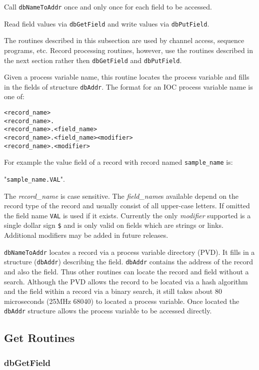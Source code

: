 Call \verb|dbNameToAddr| once and only once for each field to be accessed.

Read field values via \verb|dbGetField| and write values via \verb|dbPutField|.

The routines described in this subsection are used by channel access, sequence programs, etc. Record processing routines, 
however, use the routines described in the next section rather then \verb|dbGetField| and \verb|dbPutField|.

Given a process variable name, this routine locates the process variable and fills in the fields of structure \verb|dbAddr|. The 
format for an IOC process variable name is one of:

\begin{verbatim}<record_name>
<record_name>.
<record_name>.<field_name>
<record_name>.<field_name><modifier>
<record_name>.<modifier>
\end{verbatim}For example the value field of a record with record named \verb|sample_name| is:

       "\verb|sample_name.VAL|".

The \emph{record\_name} is case sensitive. The \emph{field\_name}s available depend on the record type of the record and usually consist 
of all upper-case letters. If omitted the field name \verb|VAL| is used if it exists. Currently the only \emph{modifier} supported is a single 
dollar sign \verb|$| and is only valid on fields which are strings or links. Additional modifiers may be added in future releases.

\verb|dbNameToAddr| locates a record via a process variable directory (PVD). It fills in a structure (\verb|dbAddr|) describing the 
field. \verb|dbAddr| contains the address of the record and also the field. Thus other routines can locate the record and field 
without a search. Although the PVD allows the record to be located via a hash algorithm and the field within a record via 
a binary search, it still takes about 80 microseconds (25MHz 68040) to located a process variable. Once located the 
\verb|dbAddr| structure allows the process variable to be accessed directly.

\subsection{Get Routines}

\subsubsection{dbGetField}

